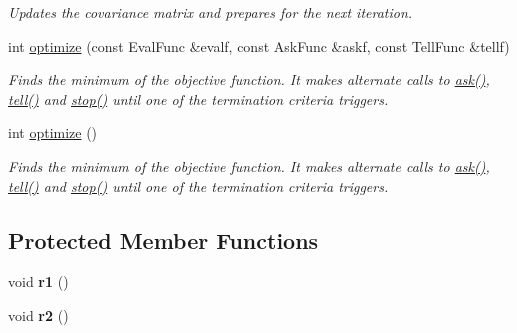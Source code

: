 \begin{DoxyCompactItemize}
\begin{DoxyCompactList}\small\item\em Updates the covariance matrix and prepares for the next iteration. \end{DoxyCompactList}\item 
int \hyperlink{classlibcmaes_1_1BIPOPCMAStrategy_a8646acea54a5e3775a040aa43fb6804c}{optimize} (const Eval\+Func \&evalf, const Ask\+Func \&askf, const Tell\+Func \&tellf)
\begin{DoxyCompactList}\small\item\em Finds the minimum of the objective function. It makes alternate calls to \hyperlink{classlibcmaes_1_1CMAStrategy_ab7266bc50732458ffcab690bc26380e6}{ask()}, \hyperlink{classlibcmaes_1_1BIPOPCMAStrategy_adc3f5ef544a151efeb96e4d4c83e1858}{tell()} and \hyperlink{classlibcmaes_1_1CMAStrategy_adc87b9c500959c800b6bc93d89432ecc}{stop()} until one of the termination criteria triggers. \end{DoxyCompactList}\item 
int \hyperlink{classlibcmaes_1_1BIPOPCMAStrategy_a7117a7300899d1b3b734ffc6efd41054}{optimize} ()
\begin{DoxyCompactList}\small\item\em Finds the minimum of the objective function. It makes alternate calls to \hyperlink{classlibcmaes_1_1CMAStrategy_ab7266bc50732458ffcab690bc26380e6}{ask()}, \hyperlink{classlibcmaes_1_1BIPOPCMAStrategy_adc3f5ef544a151efeb96e4d4c83e1858}{tell()} and \hyperlink{classlibcmaes_1_1CMAStrategy_adc87b9c500959c800b6bc93d89432ecc}{stop()} until one of the termination criteria triggers. \end{DoxyCompactList}\end{DoxyCompactItemize}
\subsection*{Protected Member Functions}
\begin{DoxyCompactItemize}
\item 
\hypertarget{classlibcmaes_1_1BIPOPCMAStrategy_a7285772ab91aa5da1bbb20485ed6136d}{void {\bfseries r1} ()}\label{classlibcmaes_1_1BIPOPCMAStrategy_a7285772ab91aa5da1bbb20485ed6136d}

\item 
\hypertarget{classlibcmaes_1_1BIPOPCMAStrategy_a1bf830b35350a9c9d63dd717dfab7c73}{void {\bfseries r2} ()}\label{classlibcmaes_1_1BIPOPCMAStrategy_a1bf830b35350a9c9d63dd717dfab7c73}

\end{DoxyCompactItemize}
